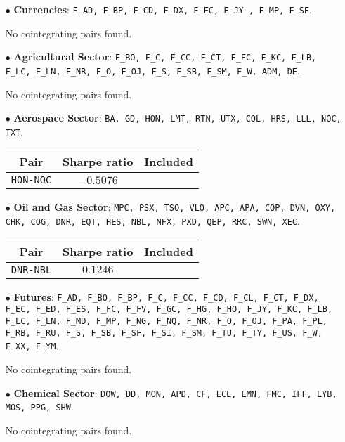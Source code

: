\documentclass{paper}
\begin{document}
\begin{itemize}
\item[$\bullet$] \textbf{Currencies}: \texttt{F\_AD, F\_BP, F\_CD, F\_DX, F\_EC, F\_JY , F\_MP, F\_SF}.

No cointegrating pairs found.

\item[$\bullet$] \textbf{Agricultural Sector}: \texttt{F\_BO, F\_C, F\_CC, F\_CT,
F\_FC, F\_KC, F\_LB, F\_LC, F\_LN, F\_NR, F\_O, F\_OJ, F\_S, F\_SB,
F\_SM, F\_W, ADM, DE}.

No cointegrating pairs found.


\item[$\bullet$] \textbf{Aerospace Sector}: \texttt{BA, GD, HON, LMT, RTN, UTX, COL, HRS, LLL, NOC, TXT}.
\begin{center}
\begin{tabular}{| c | c | c | }
\hline
\textbf{Pair} & \textbf{Sharpe ratio}  & \textbf{Included} \\ \hline
\texttt{HON-NOC} & $-0.5076$ &   \\ \hline
\end{tabular}
\end{center}


\item[$\bullet$] \textbf{Oil and Gas Sector}: \texttt{MPC, PSX, TSO, VLO, APC, APA, COP, DVN, OXY, CHK, COG, DNR, EQT, HES, NBL, NFX, PXD, QEP, 
RRC, SWN, XEC}.
\begin{center}
\begin{tabular}{| c | c | c | }
\hline
\textbf{Pair} & \textbf{Sharpe ratio}  & \textbf{Included} \\ \hline
\texttt{DNR-NBL} & $0.1246$ &   \\ \hline
\end{tabular}
\end{center}


\item[$\bullet$] \textbf{ Futures}: \texttt{F\_AD, F\_BO, F\_BP, F\_C, F\_CC, F\_CD, F\_CL, F\_CT, F\_DX, F\_EC, F\_ED, F\_ES, F\_FC, F\_FV, F\_GC, F\_HG, F\_HO, F\_JY, F\_KC, F\_LB, F\_LC, F\_LN, F\_MD, F\_MP, F\_NG, F\_NQ, F\_NR, F\_O, F\_OJ, F\_PA, F\_PL, F\_RB, F\_RU, F\_S, F\_SB, F\_SF, F\_SI, F\_SM, F\_TU, F\_TY, F\_US, F\_W, F\_XX, F\_YM}.

No cointegrating pairs found.


\item[$\bullet$] \textbf{Chemical Sector}: \texttt{DOW, DD, MON, APD, CF, ECL, EMN, FMC, IFF, LYB, MOS, PPG, SHW}.

No cointegrating pairs found.



\end{itemize}
\end{document}
